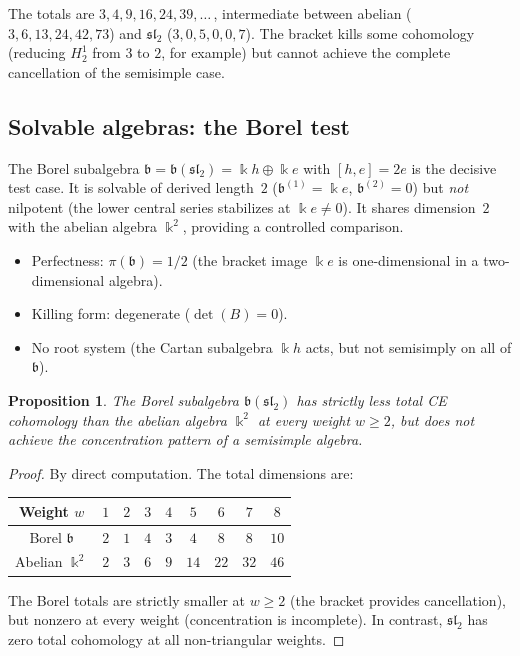 \documentclass[11pt,reqno]{amsart}
\theoremstyle{plain}
\newtheorem{proposition}[theorem]{Proposition}
\theoremstyle{definition}
\theoremstyle{remark}
\newcommand{\fb}{\mathfrak{b}}
\newcommand{\kk}{\Bbbk}
\begin{document}
\noindent
The totals are $3, 4, 9, 16, 24, 39, \ldots$\,, intermediate between abelian
($3, 6, 13, 24, 42, 73$) and $\mathfrak{sl}_2$ ($3, 0, 5, 0, 0, 7$). The
bracket kills some cohomology (reducing $H^1_2$ from $3$ to $2$, for example)
but cannot achieve the complete cancellation of the semisimple case.


\subsection{Solvable algebras: the Borel test}
\label{sec:borel}

The Borel subalgebra $\fb = \fb(\mathfrak{sl}_2) = \kk h \oplus \kk e$ with
$[h, e] = 2e$ is the decisive test case. It is solvable of derived length~$2$
($\fb^{(1)} = \kk e$, $\fb^{(2)} = 0$) but \emph{not} nilpotent (the lower
central series stabilizes at $\kk e \neq 0$). It shares dimension~$2$ with
the abelian algebra $\kk^2$, providing a controlled comparison.

\begin{itemize}
 \item Perfectness: $\pi(\fb) = 1/2$ (the bracket image $\kk e$ is
 one-dimensional in a two-dimensional algebra).
 \item Killing form: degenerate ($\det(B) = 0$).
 \item No root system (the Cartan subalgebra $\kk h$ acts, but not
 semisimply on all of $\fb$).
\end{itemize}

\begin{proposition}\label{prop:borel-test}
 The Borel subalgebra $\fb(\mathfrak{sl}_2)$ has strictly less total
 CE cohomology than the abelian algebra $\kk^2$ at every weight $w \ge 2$,
 but does not achieve the concentration pattern of a semisimple algebra.
\end{proposition}

\begin{proof}
 By direct computation. The total dimensions are:
 \begin{center}
 \begin{tabular}{c|cccccccc}
 \toprule
 Weight $w$ & $1$ & $2$ & $3$ & $4$ & $5$ & $6$ & $7$ & $8$ \\
 \midrule
 Borel $\fb$ & $2$ & $1$ & $4$ & $3$ & $4$ & $8$ & $8$ & $10$ \\
 Abelian $\kk^2$ & $2$ & $3$ & $6$ & $9$ & $14$ & $22$ & $32$ & $46$ \\
 \bottomrule
 \end{tabular}
 \end{center}
 The Borel totals are strictly smaller at $w \ge 2$ (the bracket provides
 cancellation), but nonzero at every weight (concentration is incomplete).
 In contrast, $\mathfrak{sl}_2$ has zero total cohomology at all
 non-triangular weights.
\end{proof}
\end{document}
